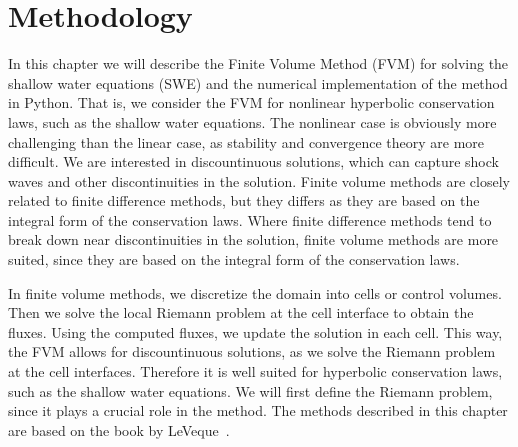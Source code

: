 \chapter{Methodology}
In this chapter we will describe the Finite Volume Method (FVM) for solving the shallow water equations (SWE) and the numerical implementation of the method in Python.
That is, we consider the FVM for nonlinear hyperbolic conservation laws, such as the shallow water equations.
The nonlinear case is obviously more challenging than the linear case, as stability and convergence theory are more difficult.
We are interested in discountinuous solutions, which can capture shock waves and other discontinuities in the solution.
Finite volume methods are closely related to finite difference methods, but they differs as they are based on the integral form of the conservation laws.
Where finite difference methods tend to break down near discontinuities in the solution, finite volume methods are more suited, since they are based on the integral form of the conservation laws.

In finite volume methods, we discretize the domain into cells or control volumes.
Then we solve the local Riemann problem at the cell interface to obtain the fluxes.
Using the computed fluxes, we update the solution in each cell.
This way, the FVM allows for discountinuous solutions, as we solve the Riemann problem at the cell interfaces.
Therefore it is well suited for hyperbolic conservation laws, such as the shallow water equations.
We will first define the Riemann problem, since it plays a crucial role in the method.
The methods described in this chapter are based on the book by LeVeque~\cite{LeVeque2002}.










